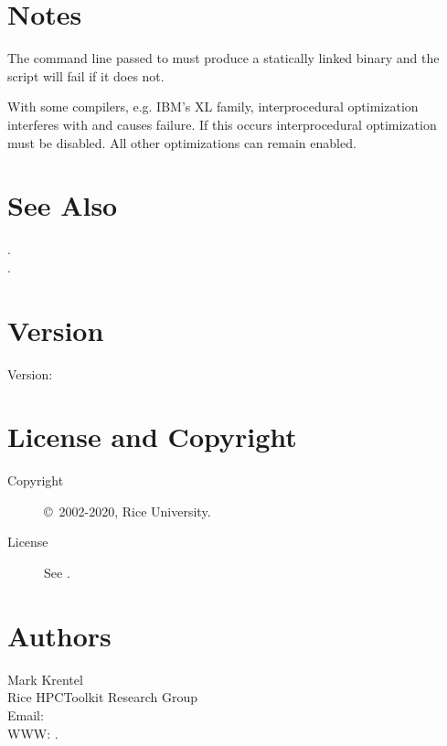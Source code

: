 \documentclass[english]{article}
\begin{document}
\section{Notes}

The command line passed to  must produce a statically linked binary and the  script will fail if it does not.

With some compilers, e.g. IBM's XL family,
interprocedural optimization interferes with  and causes failure.
If this occurs interprocedural optimization must be disabled.
All other optimizations can remain enabled.


\section{See Also}

.\\
.

\section{Version}

Version: \Version

\section{License and Copyright}

\begin{description}
\item[Copyright] \copyright\ 2002-2020, Rice University.
\item[License] See .
\end{description}

\section{Authors}

\noindent
Mark Krentel \\
Rice HPCToolkit Research Group \\
Email:  \\
WWW: .

\LatexManEnd
\end{document}
